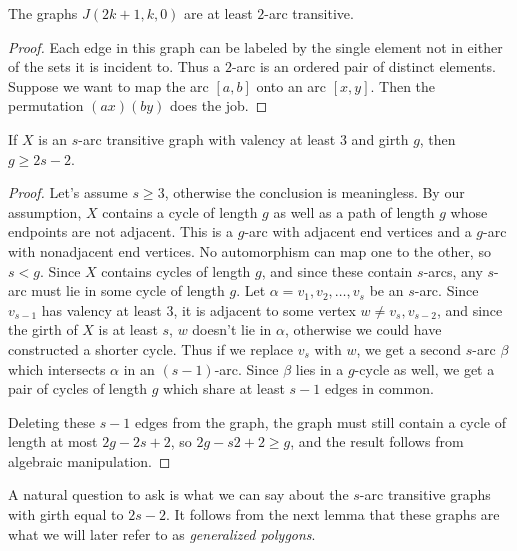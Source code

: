 \begin{lemma}
	The graphs $J(2k+1,k,0)$ are at least $2$-arc transitive.
\end{lemma}
\begin{proof}
	Each edge in this graph can be labeled by the single element not in either of the sets it is incident to.  Thus a $2$-arc is an ordered pair of distinct elements.  Suppose we want to map the arc $[a,b]$ onto an arc $[x,y]$.  Then the permutation $(ax)(by)$ does the job.
\end{proof}


\begin{lemma}[Tutte]
	If $X$ is an $s$-arc transitive graph with valency at least $3$ and girth $g$, then $g\geq 2s-2$.
\end{lemma}
\begin{proof}
	
	
	Let's assume $s\geq 3$, otherwise the conclusion is meaningless.  By our assumption, $X$ contains a cycle of length $g$ as well as a path of length $g$ whose endpoints are not adjacent.  This is a $g$-arc with adjacent end vertices and a $g$-arc with nonadjacent end vertices.  No automorphism can map one to the other, so $s<g$.  Since $X$ contains cycles of length $g$, and since these contain $s$-arcs, any $s$-arc must lie in some cycle of length $g$.  Let $\alpha=v_1,v_2,\dots,v_s$ be an $s$-arc.  Since $v_{s-1}$ has valency at least $3$, it is adjacent to some vertex $w\neq v_s,v_{s-2}$, and since the girth of $X$ is at least $s$, $w$ doesn't lie in $\alpha$, otherwise we could have constructed a shorter cycle.  Thus if we replace $v_s$ with $w$, we get a second $s$-arc $\beta$ which intersects $\alpha$ in an $(s-1)$-arc.  Since $\beta$ lies in a $g$-cycle as well, we get a pair of cycles of length $g$ which share at least $s-1$ edges in common.
	
	Deleting these $s-1$ edges from the graph, the graph must still contain a cycle of length at most $2g-2s+2$, so $2g-s2+2\geq g$, and the result follows from algebraic manipulation.
	
	
	
	
\end{proof}	
	
A natural question to ask is what we can say about the $s$-arc transitive graphs with girth equal to $2s-2$.  It follows from the next lemma that these graphs are what we will later refer to as \textit{generalized polygons}.

